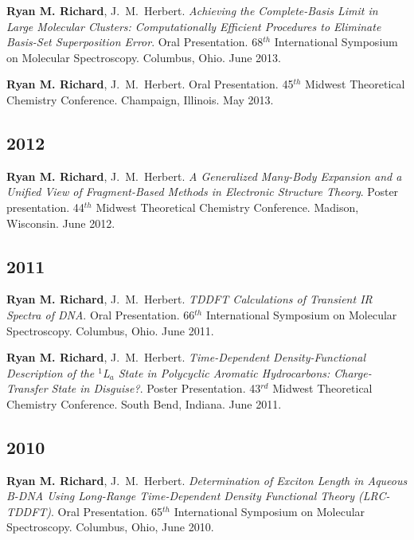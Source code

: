 \documentclass[11pt,a4paper,sans]{moderncv}
\begin{document}
\begin{etaremune}
	\item{\textbf{Ryan M. Richard}, J.~M.~Herbert.  {\em Achieving the Complete-Basis Limit in Large Molecular Clusters: Computationally Efficient Procedures to Eliminate Basis-Set Superposition Error}.  Oral Presentation.  68$^{th}$ International Symposium on Molecular Spectroscopy.  Columbus, Ohio. June 2013.}

	\item{\textbf{Ryan M. Richard}, J.~M.~Herbert.
		Oral Presentation.  45$^{th}$ Midwest Theoretical Chemistry Conference.  Champaign, Illinois.  May 2013.}

	\subsection{2012}

	\item{\textbf{Ryan M. Richard}, J.~M.~Herbert. {\em A Generalized Many-Body Expansion and a Unified View of Fragment-Based Methods in Electronic Structure Theory}.  Poster presentation.  44$^{th}$ Midwest Theoretical Chemistry Conference.  Madison, Wisconsin.  June 2012.}

	\subsection{2011}

	\item{\textbf{Ryan M. Richard}, J.~M.~Herbert.  {\em TDDFT Calculations of
	Transient IR Spectra of DNA}.  Oral Presentation.  66$^{th}$ International
	Symposium on Molecular Spectroscopy.  Columbus, Ohio.  June 2011.}

	\item{\textbf{Ryan M. Richard}, J.~M.~Herbert.  {\em Time-Dependent Density-Functional Description of the $^1$L$_a$ State in Polycyclic Aromatic Hydrocarbons: Charge-Transfer State in Disguise?}.  Poster Presentation. 43$^{rd}$ Midwest Theoretical Chemistry Conference.  South Bend, Indiana. June 2011.}
	\subsection{2010}
	\item{\textbf{Ryan M. Richard}, J.~M.~Herbert.  {\em Determination of Exciton Length in Aqueous B-DNA Using Long-Range Time-Dependent Density Functional Theory (LRC-TDDFT)}.  Oral Presentation.  65$^{th}$ International Symposium on Molecular Spectroscopy.  Columbus, Ohio, June 2010.}


\end{etaremune}
\end{document}
